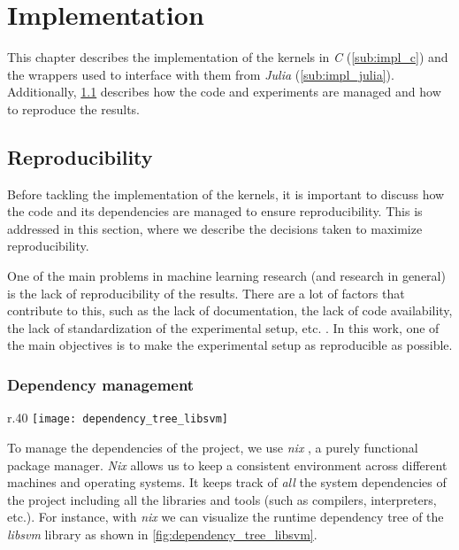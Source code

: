 \chapter{Implementation}
\label{sec:implementation}

This chapter describes the implementation of the kernels in \emph{C} (\cref{sub:impl_c}) and the wrappers
used to interface with them from \emph{Julia} (\cref{sub:impl_julia}). Additionally, \cref{sec:reproducibility}
describes how the code and experiments are managed and how to reproduce the results.

\section{Reproducibility}
\label{sec:reproducibility}

Before tackling the implementation of the kernels, it is important to discuss how the
code and its dependencies are managed to ensure reproducibility. This is addressed in
this section, where we describe the decisions taken to maximize reproducibility.

One of the main problems in machine learning research (and research in general) is the lack of
reproducibility of the results. There are a lot of factors that contribute to this, such as
the lack of documentation, the lack of code availability, the lack of standardization of
the experimental setup, etc. \cite{alstonBeginnerGuideConducting2021}. In this work, one of the main objectives is to make the
experimental setup as reproducible as possible.

\subsection{Dependency management}%
\label{sub:dependency_management}

\begin{wrapfigure}{r}{.40\textwidth}
    \texttt{[image: dependency\_tree\_libsvm]}
    \caption{\emph{libsvm} runtime dependencies.}
    \label{fig:dependency_tree_libsvm}
\end{wrapfigure}

To manage the dependencies of the project, we use \emph{nix} \cite{NixNixOSReproducible}, a purely
functional package manager. \emph{Nix} allows us to keep a consistent environment across different
machines and operating systems. It keeps track of \emph{all} the system dependencies of the project
including all the libraries and tools (such as compilers, interpreters, etc.). For instance, with
\emph{nix} we can visualize the runtime dependency tree of the \emph{libsvm} library as shown in
\cref{fig:dependency_tree_libsvm}.

